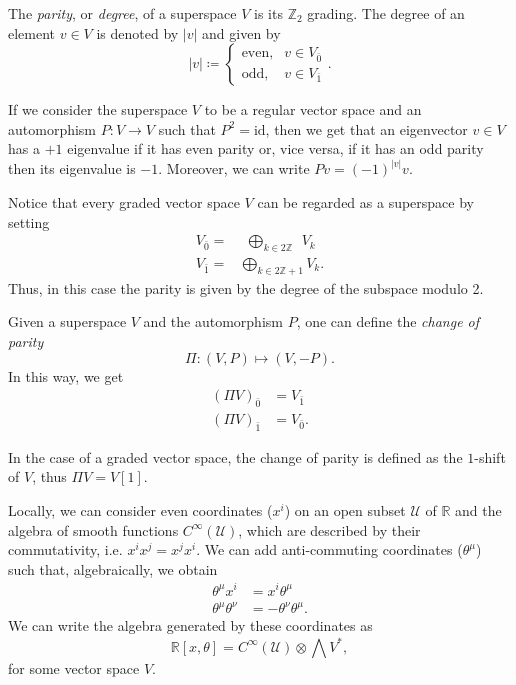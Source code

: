 \begin{definition}
    The \emph{parity}, or \emph{degree}, of a superspace $V$ is its $\mathbb{Z}_2$ grading.
    The degree of an element $v \in V$ is denoted by $|v|$ and given by
    \begin{equation*}
        |v| \coloneqq
        \begin{cases}
            \text{even}, &v \in V_{\bar{0}} \\
            \text{odd},  &v \in V_{\bar{1}}
        \end{cases}.
    \end{equation*}
\end{definition}

If we consider the superspace $V$ to be a regular vector space and an automorphism $P: V \rightarrow V$ such that $P^2 = \text{id}$, then we get that an eigenvector $v \in V$ has a $+1$ eigenvalue if it has even parity or, vice versa, if it has an odd parity then its eigenvalue is $-1$.
Moreover, we can write $P v = (-1)^{|v|}v$.

Notice that every graded vector space $V$ can be regarded as a superspace by setting
\begin{align*}
    V_{\bar{0}} =& \; \,\bigoplus_{k \in 2 \mathbb{Z}} \; \, V_k \\
    V_{\bar{1}} =& \bigoplus_{k \in 2 \mathbb{Z} + 1} V_k .
\end{align*}
Thus, in this case the parity is given by the degree of the subspace modulo 2.

Given a superspace $V$ and the automorphism $P$, one can define the \emph{change of parity}
\begin{equation*}
    \Pi : (V, P) \mapsto (V, -P) .
\end{equation*}
In this way, we get
\begin{align*}
    (\Pi V)_{\bar{0}} &= V_{\bar{1}} \\
    (\Pi V)_{\bar{1}} &= V_{\bar{0}} .
\end{align*}

In the case of a graded vector space, the change of parity is defined as the $1$-shift of $V$, thus $\Pi V= V[1]$.

\begin{example}
\label{ex:comm_anticomm}
    Locally, we can consider even coordinates ($x^i$) on an open subset $\mathcal{U}$ of $\mathbb{R}$ and the algebra of smooth functions $C^\infty (\mathcal{U})$, which are described by their commutativity, i.e. $x^i x^j = x^j x^i$.
    We can add anti-commuting coordinates ($\theta^\mu$) such that, algebraically, we obtain
    \begin{align*}
        \theta^\mu x^i &= x^i \theta^\mu \\
        \theta^\mu \theta^\nu &= -\theta^\nu \theta^\mu.
    \end{align*}
    We can write the algebra generated by these coordinates as
    \begin{equation*}
        \widehat{\mathbb{R}[x, \theta]} = C^\infty (\mathcal{U}) \otimes \bigwedge V^*,
    \end{equation*}
    for some vector space $V$.
\end{example}
